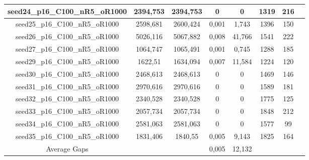 \documentclass[a4paper]{article}
\begin{document}
\begin{center}
\begin{longtable}{cccccccc}
\hline
seed24\_p16\_C100\_nR5\_oR1000 & 2394,753 & 2394,753 & 0 & 0 & 1319 & 216\\
\hline
seed25\_p16\_C100\_nR5\_oR1000 & 2598,681 & 2600,424 & 0,001 & 1,743 & 1396 & 150\\
\hline
seed26\_p16\_C100\_nR5\_oR1000 & 5026,116 & 5067,882 & 0,008 & 41,766 & 1541 & 222\\
\hline
seed27\_p16\_C100\_nR5\_oR1000 & 1064,747 & 1065,491 & 0,001 & 0,745 & 1288 & 185\\
\hline
seed29\_p16\_C100\_nR5\_oR1000 & 1622,51 & 1634,094 & 0,007 & 11,584 & 1224 & 120\\
\hline
seed30\_p16\_C100\_nR5\_oR1000 & 2468,613 & 2468,613 & 0 & 0 & 1469 & 146\\
\hline
seed31\_p16\_C100\_nR5\_oR1000 & 2970,616 & 2970,616 & 0 & 0 & 1589 & 181\\
\hline
seed32\_p16\_C100\_nR5\_oR1000 & 2340,528 & 2340,528 & 0 & 0 & 1775 & 125\\
\hline
seed33\_p16\_C100\_nR5\_oR1000 & 2057,734 & 2057,734 & 0 & 0 & 1848 & 212\\
\hline
seed34\_p16\_C100\_nR5\_oR1000 & 2581,063 & 2581,063 & 0 & 0 & 1577 & 99\\
\hline
seed35\_p16\_C100\_nR5\_oR1000 & 1831,406 & 1840,55 & 0,005 & 9,143 & 1825 & 164\\
\hline
\hline
Average Gaps & & & 0,005 & 12,132 & & \\
\hline
\hline
\end{longtable}
\end{center}
\end{document}
